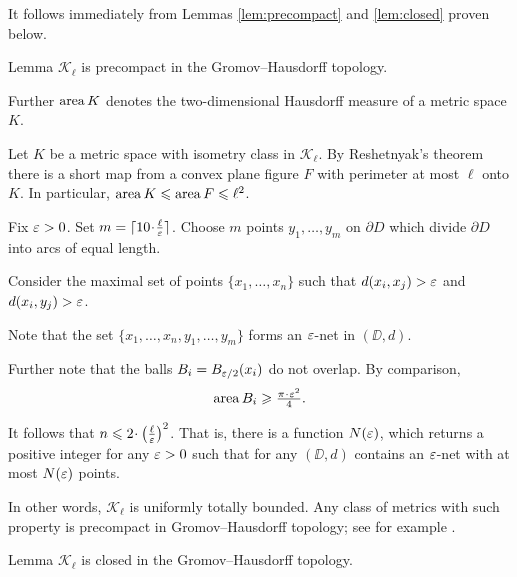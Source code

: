 \documentclass[a4paper,10pt]{amsart}
\begin{document}
It follows immediately from Lemmas \ref{lem:precompact} and \ref{lem:closed} proven below.

\begin{thm}{Lemma}\label{lem:precompact}
$\mathcal{K}_\ell$ is precompact in the Gromov--Hausdorff topology.
\end{thm}

Further $\mathop{\rm area}\nolimits K$ denotes the two-dimensional Hausdorff measure of a metric space $K$. 

Let $K$ be a metric space with isometry class in $\mathcal {K}_\ell$.
By Reshetnyak's theorem there is a short map from a convex plane figure $F$ with perimeter at most $\ell$ onto $K$.
In particular, $\mathop{\rm area}\nolimits K \leqslant \mathop{\rm area}\nolimits F 
\leqslant \ell^2$.

Fix $\varepsilon>0$. 
Set $m=\lceil 10\cdot\tfrac\ell\eps\rceil$.
Choose $m$ points $y_1,\dots,y_m$ on $\partial D$
which divide $\partial D$ into arcs of equal length.

Consider the maximal set of points $\{x_1,\dots,x_n\}$ such that $d(x_i,x_j)>\varepsilon$ and $d(x_i,y_j)>\varepsilon$.

Note that the set $\{x_1,\dots,x_n,y_1,\dots,y_m\}$
forms an $\varepsilon$-net in $(\DD,d)$.

Further note that the balls $B_i=B_{\varepsilon/2}(x_i)$
do not overlap.
By comparison,
\[\area B_i\ge \tfrac{\pi\cdot\eps^2}{4}.\]

It follows that $n\le 2\cdot\left(\tfrac\ell\eps\right)^2$.
That is, there is a function $N(\varepsilon)$,
which returns a positive integer for any $\varepsilon>0$
such that for any 
$(\DD,d)$ contains an $\varepsilon$-net
with at most $N(\varepsilon)$ points.

In other words, $\mathcal{K}_\ell$ is uniformly totally bounded.
Any class of metrics with such property is precompact in Gromov--Hausdorff topology; 
see for example \cite[7.4.15]{BBI}.
\qeds





\begin{thm}{Lemma}\label{lem:closed}
$\mathcal{K}_\ell$ is closed in the Gromov--Hausdorff topology.
\end{thm}
\end{document}
